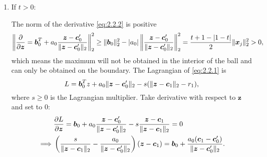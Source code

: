 \begin{enumerate}
    \item If $t>0$:
    
    The norm of the derivative \eqref{eq:2.2.2} is positive
    \begin{equation}
        \left\Vert\frac{\partial}{\partial\boldsymbol z}=\boldsymbol b_0^T+a_0\frac{\boldsymbol z-\boldsymbol c_0'}{\lVert\boldsymbol z-\boldsymbol c_0'\rVert_2}\right\Vert_2^2\geq \lVert\boldsymbol b_0\rVert_2^2-|a_0|\left\Vert\frac{\boldsymbol z-\boldsymbol c_0'}{\lVert\boldsymbol z-\boldsymbol c_0'\rVert_2}\right\Vert_2^2=\frac{t+1-|1-t|}{2}\lVert\boldsymbol x_j\rVert_2^2>0,
    \end{equation}
    which means the maximum will not be obtained in the interior of the ball and can only be obtained on the boundary. The Lagrangian of \eqref{eq:2.2.1} is
    \begin{equation}
        L=\boldsymbol b_0^Tz+a_0\lVert\boldsymbol z-\boldsymbol c'_0\rVert_2-s(\lVert\boldsymbol z-\boldsymbol c_1\rVert_2-r_1),
    \end{equation}
    where $s\geq0$ is the Lagrangian multiplier. Take derivative with respect to $\boldsymbol z$ and set to 0:
    \begin{gather}
        \begin{aligned}
            &\frac{\partial L}{\partial \boldsymbol z}=\boldsymbol b_0+a_0\frac{\boldsymbol z-\boldsymbol c_0'}{\lVert\boldsymbol z-\boldsymbol c_0'\rVert_2}-s\frac{\boldsymbol z-\boldsymbol c_1}{\lVert\boldsymbol z-\boldsymbol c_1\rVert_2}=0\\
            \implies &\left(\frac{s}{\lVert\boldsymbol z-\boldsymbol c_1\rVert_2}-\frac{a_0}{\lVert\boldsymbol z-\boldsymbol c_0'\rVert_2}\right)(\boldsymbol z-\boldsymbol c_1)=\boldsymbol b_0+\frac{a_0(\boldsymbol c_1-\boldsymbol c_0')}{\lVert\boldsymbol z- \boldsymbol c_0'\rVert_2}.
        \end{aligned}
    \end{gather}
    

\end{enumerate}
